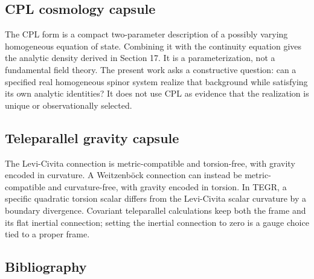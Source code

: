 \documentclass[11pt]{article}
\begin{document}
\subsection{CPL cosmology capsule}

The CPL form \texttt{} is a compact two-parameter description of a possibly varying homogeneous equation of state. Combining it with the continuity equation gives the analytic density derived in Section 17. It is a parameterization, not a fundamental field theory. The present work asks a constructive question: can a specified real homogeneous spinor system realize that background while satisfying its own analytic identities? It does not use CPL as evidence that the realization is unique or observationally selected.

\subsection{Teleparallel gravity capsule}

The Levi-Civita connection is metric-compatible and torsion-free, with gravity encoded in curvature. A Weitzenböck connection can instead be metric-compatible and curvature-free, with gravity encoded in torsion. In TEGR, a specific quadratic torsion scalar differs from the Levi-Civita scalar curvature by a boundary divergence. Covariant teleparallel calculations keep both the frame and its flat inertial connection; setting the inertial connection to zero is a gauge choice tied to a proper frame.

\subsection{Bibliography}
\end{document}
